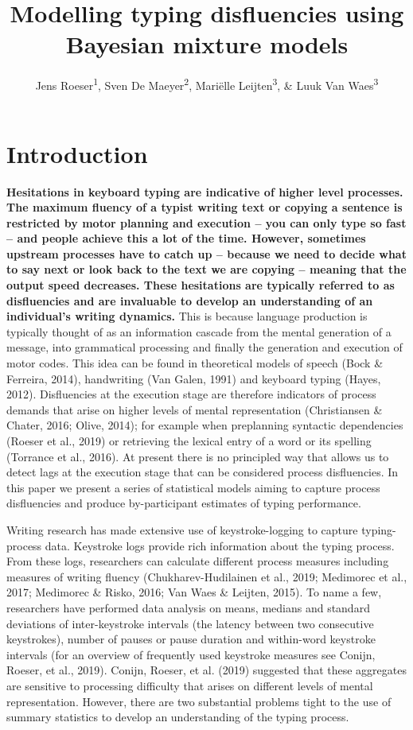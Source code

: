 \documentclass[
  english,
  man,mask,floatsintext]{apa7}
\title{Modelling typing disfluencies using Bayesian mixture models}
\author{Jens Roeser\textsuperscript{1}, Sven De Maeyer\textsuperscript{2}, Mariëlle Leijten\textsuperscript{3}, \& Luuk Van Waes\textsuperscript{3}}
\date{}
\affiliation{\vspace{0.5cm}\textsuperscript{1} Department of Psychology, Nottingham Trent University, United Kingdom\\\textsuperscript{2} Faculty of Social Sciences, University of Antwerp, Belgium\\\textsuperscript{3} Department of Management, University of Antwerp, Belgium}
\begin{document}
\maketitle

\hypertarget{introduction}{%
\section{Introduction}\label{introduction}}

\textbf{Hesitations in keyboard typing are indicative of higher level processes. The maximum fluency of a typist writing text or copying a sentence is restricted by motor planning and execution -- you can only type so fast -- and people achieve this a lot of the time. However, sometimes upstream processes have to catch up -- because we need to decide what to say next or look back to the text we are copying -- meaning that the output speed decreases. These hesitations are typically referred to as disfluencies and are invaluable to develop an understanding of an individual's writing dynamics.} This is because language production is typically thought of as an information cascade from the mental generation of a message, into grammatical processing and finally the generation and execution of motor codes. This idea can be found in theoretical models of speech (Bock \& Ferreira, 2014), handwriting (Van Galen, 1991) and keyboard typing (Hayes, 2012). Disfluencies at the execution stage are therefore indicators of process demands that arise on higher levels of mental representation (Christiansen \& Chater, 2016; Olive, 2014); for example when preplanning syntactic dependencies (Roeser et al., 2019) or retrieving the lexical entry of a word or its spelling (Torrance et al., 2016). At present there is no principled way that allows us to detect lags at the execution stage that can be considered process disfluencies. In this paper we present a series of statistical models aiming to capture process disfluencies and produce by-participant estimates of typing performance.

Writing research has made extensive use of keystroke-logging to capture typing-process data. Keystroke logs provide rich information about the typing process. From these logs, researchers can calculate different process measures including measures of writing fluency (Chukharev-Hudilainen et al., 2019; Medimorec et al., 2017; Medimorec \& Risko, 2016; Van Waes \& Leijten, 2015). To name a few, researchers have performed data analysis on means, medians and standard deviations of inter-keystroke intervals (the latency between two consecutive keystrokes), number of pauses or pause duration and within-word keystroke intervals (for an overview of frequently used keystroke measures see Conijn, Roeser, et al., 2019). Conijn, Roeser, et al. (2019) suggested that these aggregates are sensitive to processing difficulty that arises on different levels of mental representation. However, there are two substantial problems tight to the use of summary statistics to develop an understanding of the typing process.
\end{document}
